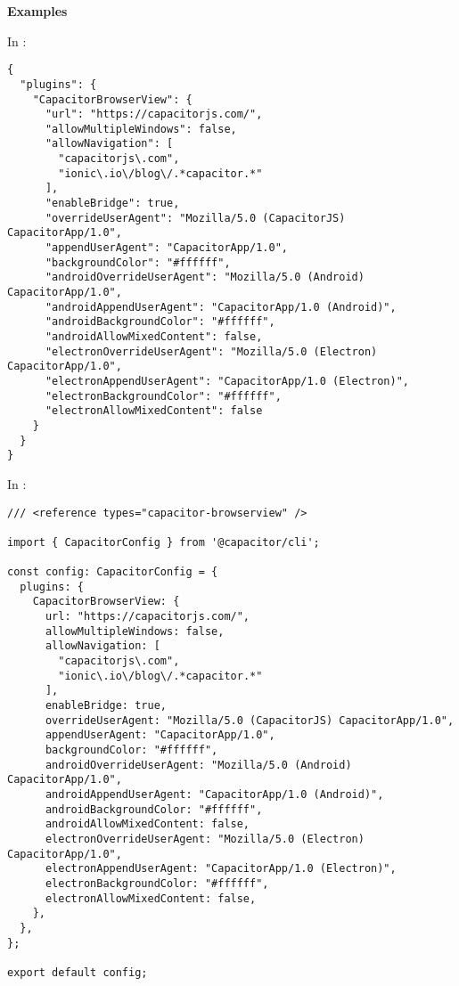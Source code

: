 \newpage

\textbf{Examples}

In :

\begin{verbatim}
{
  "plugins": {
    "CapacitorBrowserView": {
      "url": "https://capacitorjs.com/",
      "allowMultipleWindows": false,
      "allowNavigation": [
        "capacitorjs\.com",
        "ionic\.io\/blog\/.*capacitor.*"
      ],
      "enableBridge": true,
      "overrideUserAgent": "Mozilla/5.0 (CapacitorJS) CapacitorApp/1.0",
      "appendUserAgent": "CapacitorApp/1.0",
      "backgroundColor": "#ffffff",
      "androidOverrideUserAgent": "Mozilla/5.0 (Android) CapacitorApp/1.0",
      "androidAppendUserAgent": "CapacitorApp/1.0 (Android)",
      "androidBackgroundColor": "#ffffff",
      "androidAllowMixedContent": false,
      "electronOverrideUserAgent": "Mozilla/5.0 (Electron) CapacitorApp/1.0",
      "electronAppendUserAgent": "CapacitorApp/1.0 (Electron)",
      "electronBackgroundColor": "#ffffff",
      "electronAllowMixedContent": false
    }
  }
}
\end{verbatim}

In :

\begin{verbatim}
/// <reference types="capacitor-browserview" />

import { CapacitorConfig } from '@capacitor/cli';

const config: CapacitorConfig = {
  plugins: {
    CapacitorBrowserView: {
      url: "https://capacitorjs.com/",
      allowMultipleWindows: false,
      allowNavigation: [
        "capacitorjs\.com",
        "ionic\.io\/blog\/.*capacitor.*"
      ],
      enableBridge: true,
      overrideUserAgent: "Mozilla/5.0 (CapacitorJS) CapacitorApp/1.0",
      appendUserAgent: "CapacitorApp/1.0",
      backgroundColor: "#ffffff",
      androidOverrideUserAgent: "Mozilla/5.0 (Android) CapacitorApp/1.0",
      androidAppendUserAgent: "CapacitorApp/1.0 (Android)",
      androidBackgroundColor: "#ffffff",
      androidAllowMixedContent: false,
      electronOverrideUserAgent: "Mozilla/5.0 (Electron) CapacitorApp/1.0",
      electronAppendUserAgent: "CapacitorApp/1.0 (Electron)",
      electronBackgroundColor: "#ffffff",
      electronAllowMixedContent: false,
    },
  },
};

export default config;
\end{verbatim}
